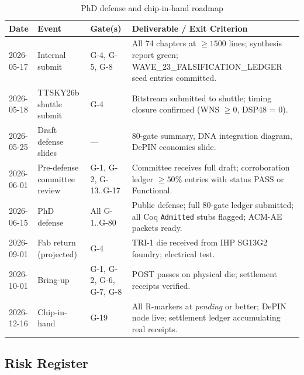 \begin{table}[H]
\centering
\caption{PhD defense and chip-in-hand roadmap}
\label{tab74:defense-phases}
\renewcommand{\arraystretch}{1.5}
\small
\begin{tabular}{lllp{5.5cm}}
\toprule
Date & Event & Gate(s) & Deliverable / Exit Criterion \\
\midrule
2026-05-17
  & Internal submit
  & G-4, G-5, G-8
  & All 74 chapters at $\geq 1500$ lines; synthesis report green;
    WAVE\_23\_FALSIFICATION\_LEDGER seed entries committed. \\
2026-05-18
  & TTSKY26b shuttle submit
  & G-4
  & Bitstream submitted to shuttle; timing closure confirmed
    (WNS $\geq 0$, DSP48 = 0). \\
2026-05-25
  & Draft defense slides
  & —
  & 80-gate summary, DNA integration diagram, DePIN economics slide. \\
2026-06-01
  & Pre-defense committee review
  & G-1, G-2, G-13..G-17
  & Committee receives full draft; corroboration ledger $\geq 50\%$
    entries with status PASS or Functional. \\
2026-06-15
  & PhD defense
  & All G-1..G-80
  & Public defense; full 80-gate ledger submitted; all Coq
    \texttt{Admitted} stubs flagged; ACM-AE packets ready. \\
2026-09-01
  & Fab return (projected)
  & G-4
  & TRI-1 die received from IHP SG13G2 foundry; electrical test. \\
2026-10-01
  & Bring-up
  & G-1, G-2, G-6, G-7, G-8
  & POST passes on physical die; settlement receipts verified. \\
2026-12-16
  & Chip-in-hand
  & G-19
  & All R-markers at \textit{pending} or better; DePIN node live;
    settlement ledger accumulating real receipts. \\
\bottomrule
\end{tabular}
\end{table}

\subsection{Risk Register}
\label{sec74:risks}

